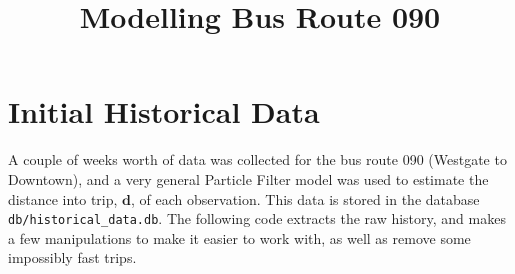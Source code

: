 \documentclass[11pt]{article}\usepackage[]{graphicx}\usepackage[]{color}
\title{Modelling Bus Route 090}
\author{}
\date{}
\newcommand{\bd}{\boldsymbol{d}}
\begin{document}
\maketitle



\section{Initial Historical Data}
\label{sec:historical-data}


A couple of weeks worth of data was collected for the bus route 090 (Westgate to Downtown), 
and a very general Particle Filter model was used to estimate the distance into trip, $\bd$,
of each observation. 
This data is stored in the database \texttt{db/historical\_data.db}.
The following code extracts the raw history, 
and makes a few manipulations to make it easier to work with,
as well as remove some impossibly fast trips.
\end{document}
